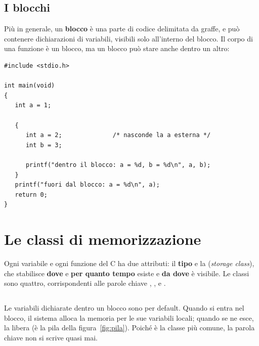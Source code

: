 \subsection{I blocchi}

Più in generale, un \textbf{blocco} è una parte di codice delimitata da
graffe, e può contenere dichiarazioni di variabili, visibili solo
all'interno del blocco. Il corpo di una funzione è un blocco, ma un blocco
può stare anche dentro un altro:

\begin{affianco}[0.5][c]
\begin{lstlisting}[style=c, name=blocchi.c]
#include <stdio.h>

int main(void)
{
   int a = 1;

   {
      int a = 2;              /* nasconde la a esterna */
      int b = 3;

      printf("dentro il blocco: a = %d, b = %d\n", a, b);
   }
   printf("fuori dal blocco: a = %d\n", a);
   return 0;
}
\end{lstlisting}
\risultato
{}
\end{affianco}

\section{Le classi di memorizzazione}

Ogni variabile e ogni funzione del C ha due attributi: il \textbf{tipo} e la
 (\textit{storage class}), che stabilisce
\textbf{dove} e \textbf{per quanto tempo} esiste e \textbf{da dove} è
visibile. Le classi sono quattro, corrispondenti alle parole chiave
, ,  e .

\subsection{}

Le variabili dichiarate dentro un blocco sono  per default.
Quando si entra nel blocco, il sistema alloca la memoria per le sue variabili
locali; quando se ne esce, la libera (è la pila della
figura~\ref{fig:pila}). Poiché è la classe più comune, la parola chiave
 non si scrive quasi mai.

